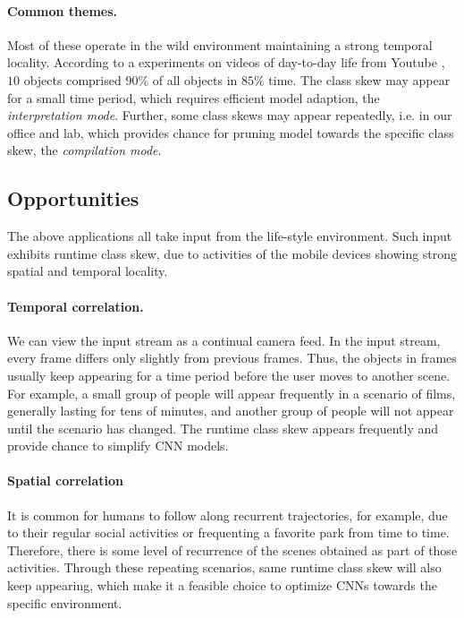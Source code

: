 \documentclass[pageno]{jpaper}
\begin{document}
\paragraph{Common themes.} Most of these operate in the wild environment maintaining a strong temporal locality. According to a experiments on videos of day-to-day life from Youtube \cite{shen2016fast}, $10$ objects comprised $90$\% of all objects in $85$\% time. The class skew may appear for a small time period, which requires efficient model adaption, the \textit{interpretation mode}. Further, some class skews may appear repeatedly, i.e. in our office and lab, which provides chance for pruning model towards the specific class skew, the \textit{compilation mode}.




\subsection{Opportunities}
The above applications all take input from the life-style environment. Such input exhibits runtime class skew, due to activities of the mobile devices showing strong spatial and temporal locality. 

\paragraph{Temporal correlation.} We can view the input stream as a continual camera feed. In the input stream, every frame differs only slightly from previous frames. Thus, the objects in frames usually keep appearing for a time period before the user moves to another scene. For example, a small group of people will appear frequently in a scenario of films, generally lasting for tens of minutes, and another group of people will not appear until the scenario has changed. The runtime class skew appears frequently and provide chance to simplify CNN models. 

\paragraph{Spatial correlation} It is common for humans to follow along recurrent trajectories, for example, due to their regular social activities or frequenting a favorite park from time to time. Therefore, there is some level of recurrence of the scenes obtained as part of those activities. Through these repeating scenarios, same runtime class skew will also keep appearing, which make it a feasible choice to optimize CNNs towards the specific environment.
\end{document}
